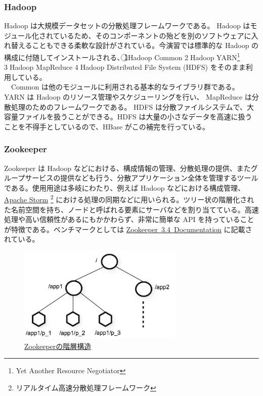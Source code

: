 \documentclass{scrartcl}
\begin{document}
\subsubsection{Hadoop}
\label{sec:org16ee4d4}
Hadoop は大規模データセットの分散処理フレームワークである。 Hadoop はモジュール化されているため、そのコンポーネントの殆どを別のソフトウェアに入れ替えることもできる柔軟な設計がされている。今演習では標準的な Hadoop の構成に付随してインストールされる、\textcircled{\scriptsize 1}Hadoop Common \textcircled{\scriptsize 2}Hadoop YARN\footnote{Yet Another Resource Negotiator} \textcircled{\scriptsize 3}Hadoop MapReduce \textcircled{\scriptsize 4}Hadoop Distributed File System (HDFS) をそのまま利用している。\\
　Common は他のモジュールに利用される基本的なライブラリ群である。 YARN は Hadoop のリソース管理やスケジューリングを行い、 MapReduce は分散処理のためのフレームワークである。 HDFS は分散ファイルシステムで、大容量ファイルを扱うことができる。HDFS は大量の小さなデータを高速に扱うことを不得手としているので、HBase がこの補完を行っている。\\
\subsubsection{Zookeeper}
\label{sec:org8f3e1d4}
Zookeeper は Hadoop などにおける、構成情報の管理、分散処理の提供、またグループサービスの提供なども行う、分散アプリケーション全体を管理するツールである。使用用途は多岐にわたり、例えば Hadoop などにおける構成管理、 \href{http://storm.apache.org/}{Apache Storm}\textsuperscript{\texttrademark} \footnote{リアルタイム高速分散処理フレームワーク} における処理の同期などに用いられる。ツリー状の階層化された名前空間を持ち、ノードと呼ばれる要素にサーバなどを割り当てている。高速処理や高い信頼性があるにもかかわらず、非常に簡単な API を持っていることが特徴である。ベンチマークとしては \href{http://zookeeper.apache.org/doc/current/zookeeperOver.html#fg_zkPerfRW}{Zookeeper\ 3.4\ Documentation} に記載されている。\\


\begin{figure}[htbp]
\centering
\includegraphics[width=8cm]{./zknamespace.jpg}
\caption{\href{http://zookeeper.apache.org/doc/current/zookeeperOver.html\#fg_zkPerfRW}{Zookeeperの階層構造}}
\end{figure}
\end{document}
